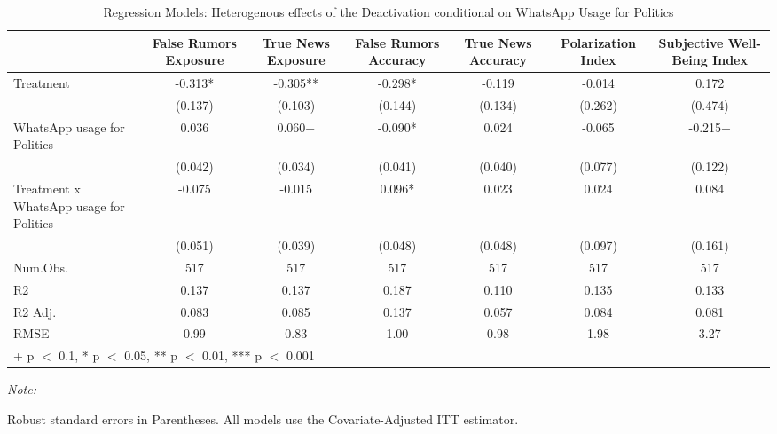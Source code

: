 \begin{table}

\caption{Regression Models: Heterogenous effects of the Deactivation conditional on WhatsApp Usage for Politics }
\centering
\begin{threeparttable}
\begin{tabular}[t]{lcccccc}
\toprule
  & False Rumors Exposure & True News Exposure & False Rumors Accuracy & True News Accuracy & Polarization Index & Subjective Well-Being Index\\
\midrule
Treatment & -0.313* & -0.305** & -0.298* & -0.119 & -0.014 & 0.172\\
 & (0.137) & (0.103) & (0.144) & (0.134) & (0.262) & (0.474)\\
WhatsApp usage for Politics & 0.036 & 0.060+ & -0.090* & 0.024 & -0.065 & -0.215+\\
 & (0.042) & (0.034) & (0.041) & (0.040) & (0.077) & (0.122)\\
Treatment x WhatsApp usage for Politics & -0.075 & -0.015 & 0.096* & 0.023 & 0.024 & 0.084\\
 & (0.051) & (0.039) & (0.048) & (0.048) & (0.097) & (0.161)\\
\midrule
Num.Obs. & 517 & 517 & 517 & 517 & 517 & 517\\
R2 & 0.137 & 0.137 & 0.187 & 0.110 & 0.135 & 0.133\\
R2 Adj. & 0.083 & 0.085 & 0.137 & 0.057 & 0.084 & 0.081\\
RMSE & 0.99 & 0.83 & 1.00 & 0.98 & 1.98 & 3.27\\
\bottomrule
\multicolumn{7}{l}{\rule{0pt}{1em}+ p $<$ 0.1, * p $<$ 0.05, ** p $<$ 0.01, *** p $<$ 0.001}\\
\end{tabular}
\begin{tablenotes}
\item \textit{Note: } 
\item  Robust standard errors in Parentheses. All models use the Covariate-Adjusted ITT estimator. 
\end{tablenotes}
\end{threeparttable}
\end{table}
